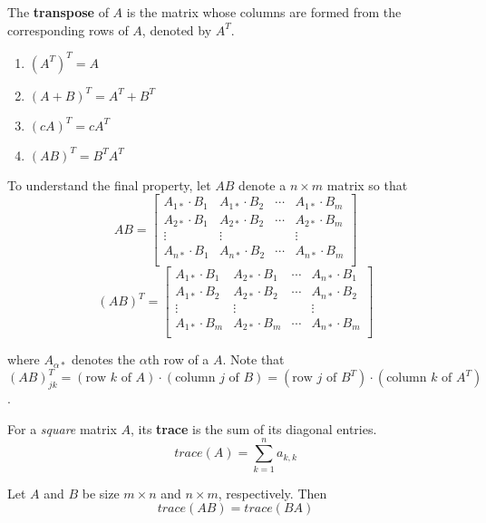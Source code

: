 \begin{definition}
The \textbf{transpose} of $A$ is the matrix whose columns are formed from the corresponding rows of $A$, denoted by $A^T$. 
\begin{enumerate}
	\item $(A^T)^T = A$
	\item $(A + B)^T = A^T + B^T$
	\item $(cA)^T = cA^T$
	\item $(AB)^T = B^T A^T$
\end{enumerate}

To understand the final property, let $AB$ denote a $n \times m$ matrix so that 
$$AB = \begin{bmatrix}
A_{1*} \cdot B_{1} & A_{1*} \cdot B_{2} & \cdots & A_{1*} \cdot B_{m} \\
A_{2*} \cdot B_{1} & A_{2*} \cdot B_{2} & \cdots & A_{2*} \cdot B_{m} \\
\vdots & \vdots &  & \vdots \\
A_{n*} \cdot B_{1} & A_{n*} \cdot B_{2} & \cdots & A_{n*} \cdot B_{m} \\
\end{bmatrix}$$
$$(AB)^{T} = \begin{bmatrix}
A_{1*} \cdot B_{1} & A_{2*} \cdot B_{1} & \cdots & A_{n*} \cdot B_{1} \\
A_{1*} \cdot B_{2} & A_{2*} \cdot B_{2} & \cdots & A_{n*} \cdot B_{2} \\
\vdots & \vdots &  & \vdots \\
A_{1*} \cdot B_{m} & A_{2*} \cdot B_{m} & \cdots & A_{n*} \cdot B_{m} \\

\end{bmatrix}$$

where $A_{\alpha *}$ denotes the $\alpha$th row of a $A$. Note that $(AB)^{T}_{jk} = (\text{row $k$ of $A$}) \cdot (\text{column $j$ of $B$}) = (\text{row $j$ of $B^{T}$}) \cdot (\text{column $k$ of $A^{T}$}) $. 

\end{definition}

\begin{definition}
For a \textit{square} matrix $A$, its \textbf{trace} is the sum of its diagonal entries. 
$$trace(A) = \sum_{k=1}^{n} a_{k, k}$$
\end{definition}

\begin{theorem}
Let $A$ and $B$ be size $m \times n$ and $n \times m$, respectively. Then $$trace(AB) = trace(BA)$$
\end{theorem}

